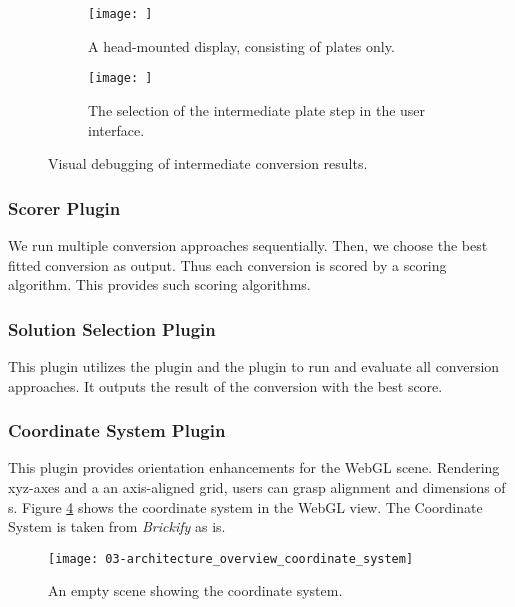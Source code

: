 \documentclass[../ClassicThesis.tex]{subfiles}
\begin{document}
\begin{figure}[h]
  \centering
  \begin{subfigure}[a]{0.48\textwidth}
    \texttt{[image: ]}
    \caption{A head-mounted display, consisting of plates only.}
    \label{fig:steps:plate}
  \end{subfigure}
  \begin{subfigure}[b]{0.48\textwidth}
    \texttt{[image: ]}
    \caption{The selection of the intermediate plate step in
      the user interface.}
    \label{fig:steps:ui}
  \end{subfigure}
  \label{fig:steps}
  \caption{Visual debugging of intermediate conversion results.}
\end{figure}

\subsubsection{Scorer Plugin}

We run multiple conversion approaches sequentially. Then, we choose
the best fitted conversion as output. Thus each conversion
is scored by a scoring algorithm. This
 provides such scoring algorithms.

\subsubsection{Solution Selection Plugin}

This plugin utilizes the  plugin and
the  plugin to run and evaluate all conversion
approaches. It outputs the result of the conversion with the
best score.

\subsubsection{Coordinate System Plugin}

This plugin provides orientation enhancements for the WebGL
scene. Rendering xyz-axes and a an axis-aligned grid, users
can grasp alignment and dimensions of {\threedmodel}s.
Figure \ref{fig:architecture_overview_coordinate_system}
shows the coordinate system in the WebGL view. The
Coordinate System is taken from \emph{Brickify} as
is\cite{}.

\begin{figure}
  \texttt{[image: 03-architecture\_overview\_coordinate\_system]}
  \caption{An empty scene showing the coordinate system.}
  \label{fig:architecture_overview_coordinate_system}
\end{figure}
\end{document}
